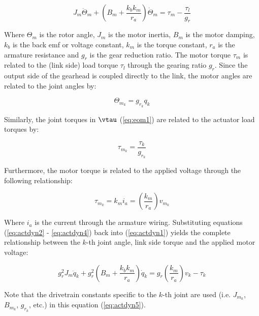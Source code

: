 \begin{equation}
	{J_m}{\ddot \Theta _m} + \left( {{B_m} + \frac{{{k_b}{k_m}}}{{{r_a}}}} \right)\dot \Theta _m  = {\tau _m} - \frac{{{\tau _l}}}{{{g_r}}}
	\label{eq:actdyn1}
\end{equation}

Where $\Theta _m$ is the rotor angle, $J_m$ is the motor inertia, $B_m$ is the motor damping, $k_b$ is the back emf or voltage constant, $k_m$ is the torque constant, $r_a$ is the armature resistance and $g_r$ is the gear reduction ratio. The motor torque $\tau _m$ is related to the (link side) load torque $\tau _l$ through the gearing ratio $g_r$. Since the output side of the gearhead is coupled directly to the link, the motor angles are related to the joint angles by: 

\begin{equation}
	{\Theta _{m_k}} = {g _{r_k}} {q _k}
	\label{eq:actdyn2} 
\end{equation}

Similarly, the joint torques in $\vtau$ (\ref{eq:eom1}) are related to the actuator load torques by: 

\begin{equation}
	{\tau _{m_k}} = {\frac{\tau _{k}}{g _{r_k}}} 
	\label{eq:actdyn3}
\end{equation}

Furthermore, the motor torque is related to the applied voltage through the following relationship: 

\begin{equation}
	{\tau _{m_k}} = {k_m} {i_a} = \left( {\frac{{{k_m}}}{{{r_a}}}} \right){v _{m_k}}
	\label{eq:actdyn4}
\end{equation}


Where $i_a$ is the current through the armature wiring. Substituting equations (\ref{eq:actdyn2} - \ref{eq:actdyn4}) back into (\ref{eq:actdyn1}) yields the complete relationship between the $k$-th joint angle, link side torque and the applied motor voltage:

\begin{equation}
	g_r^2{J_m}{\ddot q_k} + g_r^2\left( {{B_m} + \frac{{{k_b}{k_m}}}{{{r_a}}}} \right){\dot q_k} = g_r^{}\left( {\frac{{{k_m}}}{{{r_a}}}} \right){v_k} - {\tau _k}
	\label{eq:actdyn5}
\end{equation}

Note that the drivetrain constants specific to the $k$-th joint are used (i.e. ${J _{m_k}}$, ${B _{m_k}}$, $g _{r_k}$, etc.) in this equation (\ref{eq:actdyn5}). 

